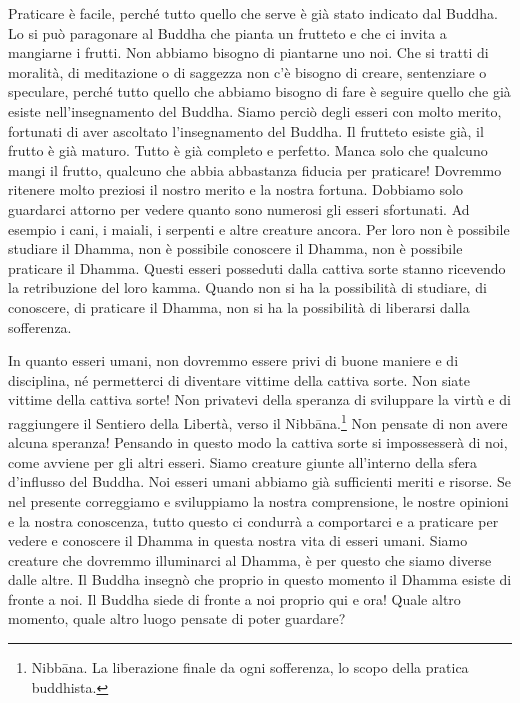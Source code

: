 Praticare è facile, perché tutto quello che serve è già stato indicato
dal Buddha. Lo si può paragonare al Buddha che pianta un frutteto e che
ci invita a mangiarne i frutti. Non abbiamo bisogno di piantarne uno
noi. Che si tratti di moralità, di meditazione o di saggezza non c'è
bisogno di creare, sentenziare o speculare, perché tutto quello che
abbiamo bisogno di fare è seguire quello che già esiste
nell'insegnamento del Buddha. Siamo perciò degli esseri con molto
merito, fortunati di aver ascoltato l'insegnamento del Buddha. Il
frutteto esiste già, il frutto è già maturo. Tutto è già completo e
perfetto. Manca solo che qualcuno mangi il frutto, qualcuno che abbia
abbastanza fiducia per praticare! Dovremmo ritenere molto preziosi il
nostro merito e la nostra fortuna. Dobbiamo solo guardarci attorno per
vedere quanto sono numerosi gli esseri sfortunati. Ad esempio i cani, i
maiali, i serpenti e altre creature ancora. Per loro non è possibile
studiare il Dhamma, non è possibile conoscere il Dhamma, non è possibile
praticare il Dhamma. Questi esseri posseduti dalla cattiva sorte stanno
ricevendo la retribuzione del loro kamma. Quando non si ha la
possibilità di studiare, di conoscere, di praticare il Dhamma, non si ha
la possibilità di liberarsi dalla sofferenza.

In quanto esseri umani, non dovremmo essere privi di buone maniere e di
disciplina, né permetterci di diventare vittime della cattiva sorte. Non
siate vittime della cattiva sorte! Non privatevi della speranza di
sviluppare la virtù e di raggiungere il Sentiero della Libertà, verso il
Nibbāna.\footnote{Nibbāna. La liberazione finale da ogni
  sofferenza, lo scopo della pratica buddhista.} Non pensate di non
avere alcuna speranza! Pensando in questo modo la cattiva sorte si
impossesserà di noi, come avviene per gli altri esseri. Siamo creature
giunte all'interno della sfera d'influsso del Buddha. Noi esseri umani
abbiamo già sufficienti meriti e risorse. Se nel presente correggiamo e
sviluppiamo la nostra comprensione, le nostre opinioni e la nostra
conoscenza, tutto questo ci condurrà a comportarci e a praticare per
vedere e conoscere il Dhamma in questa nostra vita di esseri umani.
Siamo creature che dovremmo illuminarci al Dhamma, è per questo che
siamo diverse dalle altre. Il Buddha insegnò che proprio in questo
momento il Dhamma esiste di fronte a noi. Il Buddha siede di fronte a
noi proprio qui e ora! Quale altro momento, quale altro luogo pensate di
poter guardare?

